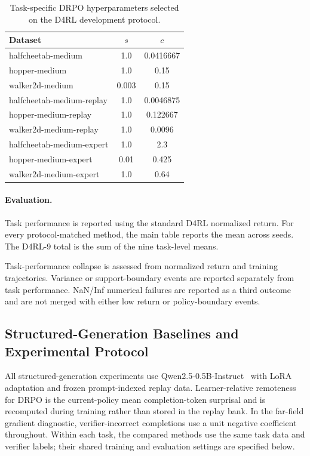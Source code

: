 \documentclass{article}
\theoremstyle{plain}
\theoremstyle{definition}
\theoremstyle{remark}
\begin{document}
\begin{table}[t]
\centering
\caption{Task-specific DRPO hyperparameters selected on the D4RL development
protocol.}
\label{tab:d4rl_drpo_hyperparameters}
\small
\setlength{\tabcolsep}{4pt}
\renewcommand{\arraystretch}{1.05}
\begin{tabular}{lcc}
\toprule
Dataset & \(s\) & \(c\) \\
\midrule
halfcheetah-medium        & 1.0   & 0.0416667 \\
hopper-medium             & 1.0   & 0.15 \\
walker2d-medium           & 0.003 & 0.15 \\
halfcheetah-medium-replay & 1.0   & 0.0046875 \\
hopper-medium-replay      & 1.0   & 0.122667 \\
walker2d-medium-replay    & 1.0   & 0.0096 \\
halfcheetah-medium-expert & 1.0   & 2.3 \\
hopper-medium-expert      & 0.01  & 0.425 \\
walker2d-medium-expert    & 1.0   & 0.64 \\
\bottomrule
\end{tabular}
\end{table}

\paragraph{Evaluation.}

Task performance is reported using the standard D4RL normalized return.
For every protocol-matched method, the main table reports the mean across
seeds. The D4RL-9 total is the sum of the nine task-level means.

Task-performance collapse is assessed from normalized return and
training trajectories. Variance or support-boundary events are reported
separately from task performance. NaN/Inf numerical failures are
reported as a third outcome and are not merged with either low return or
policy-boundary events. 


\subsection{Structured-Generation Baselines and Experimental Protocol}
\label{app:structured_generation_methods}

All structured-generation experiments use
Qwen2.5-0.5B-Instruct~\citep{qwen2024qwen25} with LoRA adaptation and
frozen prompt-indexed replay data. Learner-relative remoteness for DRPO is
the current-policy mean completion-token surprisal and is recomputed during
training rather than stored in the replay bank. In the far-field gradient
diagnostic, verifier-incorrect completions use a unit negative coefficient
throughout. Within each task, the compared methods use the same task data and
verifier labels; their shared training and evaluation settings are specified
below.
\end{document}
